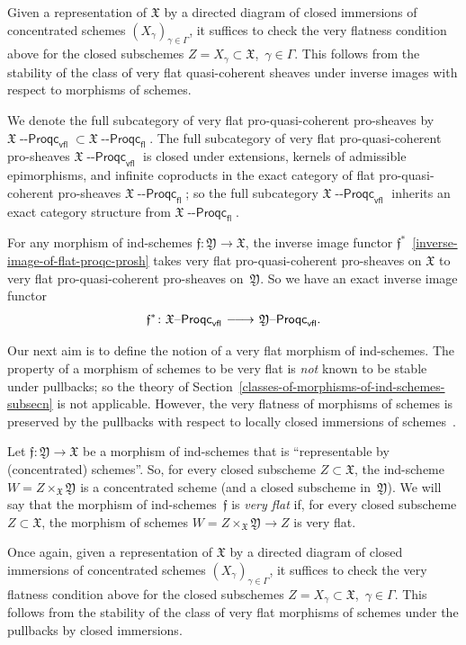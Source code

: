 \documentclass[12pt,a4paper]{amsart}
\newcommand{\+}{\protect\nobreakdash-}
\renewcommand{\:}{\colon}
\newcommand{\rarrow}{\longrightarrow}
\newcommand{\lrarrow}{\mskip.5\thinmuskip\relbar\joinrel\relbar\joinrel
 \rightarrow\mskip.5\thinmuskip\relax}
\newcommand{\Proqc}{{\operatorname{\mathsf{--Proqc}}}}
\newcommand{\fl}{\mathsf{fl}}
\newcommand{\vfl}{\mathsf{vfl}}
\newcommand{\fX}{\mathfrak X}
\newcommand{\fY}{\mathfrak Y}
\newcommand{\ff}{\mathfrak f}
\theoremstyle{plain}
\theoremstyle{definition}
\begin{document}
 Given a representation of $\fX$ by a directed diagram of closed
immersions of concentrated schemes $(X_\gamma)_{\gamma\in\Gamma}$,
it suffices to check the very flatness condition above for the closed
subschemes $Z=X_\gamma\subset\fX$, \,$\gamma\in\Gamma$.
 This follows from the stability of the class of very flat
quasi-coherent sheaves under inverse images with respect to
morphisms of schemes.

 We denote the full subcategory of very flat pro-quasi-coherent
pro-sheaves by $\fX\Proqc_\vfl\subset\fX\Proqc_\fl$.
 The full subcategory of very flat pro-quasi-coherent pro-sheaves
$\fX\Proqc_\vfl$ is closed under extensions, kernels of admissible
epimorphisms, and infinite coproducts in the exact category of flat
pro-quasi-coherent pro-sheaves $\fX\Proqc_\fl$; so the full subcategory
$\fX\Proqc_\vfl$ inherits an exact category structure from
$\fX\Proqc_\fl$.

 For any morphism of ind-schemes $\ff\:\fY\rarrow\fX$, the inverse
image functor $\ff^*$ \,\eqref{inverse-image-of-flat-proqc-prosh}
takes very flat pro-quasi-coherent pro-sheaves on $\fX$ to very flat
pro-quasi-coherent pro-sheaves on~$\fY$.
 So we have an exact inverse image functor
\begin{equation} \label{inverse-image-of-very-flat-proqc-prosh}
 \ff^*\:\fX\Proqc_\vfl\lrarrow\fY\Proqc_\vfl.
\end{equation}

 Our next aim is to define the notion of a very flat morphism of
ind-schemes.
 The property of a morphism of schemes to be very flat is \emph{not}
known to be stable under pullbacks; so the theory of
Section~\ref{classes-of-morphisms-of-ind-schemes-subsecn} is
not applicable.
 However, the very flatness of morphisms of schemes is preserved by
the pullbacks with respect to locally closed immersions of
schemes~\cite[Lemma~2.10.1]{Pcosh}.

 Let $\ff:\fY\rarrow\fX$ be a morphism of ind-schemes that is
``representable by (concentrated) schemes''.
 So, for every closed subscheme $Z\subset\fX$, the ind-scheme
$W=Z\times_\fX\fY$ is a concentrated scheme (and a closed subscheme
in~$\fY$).
 We will say that the morphism of ind-schemes~$\ff$ is \emph{very flat}
if, for every closed subscheme $Z\subset\fX$, the morphism of
schemes $W=Z\times_\fX\fY\rarrow Z$ is very flat.

 Once again, given a representation of $\fX$ by a directed diagram of
closed immersions of concentrated schemes
$(X_\gamma)_{\gamma\in\Gamma}$, it suffices to check the very flatness
condition above for the closed subschemes $Z=X_\gamma\subset\fX$,
\,$\gamma\in\Gamma$.
 This follows from the stability of the class of very flat morphisms
of schemes under the pullbacks by closed immersions.
\end{document}
